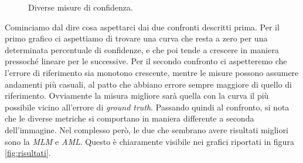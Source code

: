 \documentclass[12pt]{report}
\begin{document}
\begin{figure}[!h]
				 \quad 
				 \quad
				
				\caption{Diverse misure di confidenza.}
				\label{fig:disparità&costi}
			\end{figure}
			
			\noindent Cominciamo dal dire cosa aspettarci dai due confronti descritti prima. Per il primo grafico ci aspettiamo di trovare una curva che resta a zero per una determinata percentuale di confidenze, e che  poi tende a crescere in maniera pressoché lineare per le successive. Per il secondo confronto ci aspetteremo che l'errore di riferimento sia monotono crescente, mentre le misure possono assumere andamenti più casuali, al patto che abbiano errore sempre maggiore di quello di riferimento. Ovviamente la misura migliore sarà quella con la curva il più possibile vicino all'errore di \textit{ground truth}. \newline
			Passando quindi al confronto, si nota che le diverse metriche si comportano in maniera differente a seconda dell'immagine. Nel complesso però, le due che sembrano avere risultati migliori sono la \textit{MLM} e \textit{AML}. Questo è chiaramente visibile nei grafici riportati in figura \ref{fig:risultati}.   
			
\end{document}
